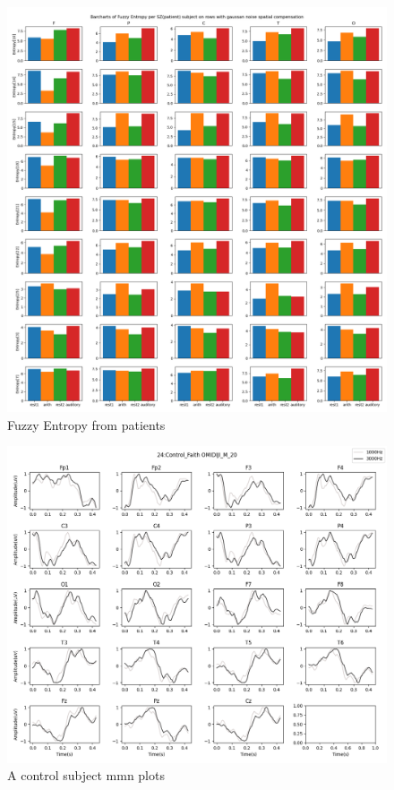 \documentclass[10pt]{article}
\begin{document}
\begin{figure}[H]
  \includegraphics[width=16cm]{../../../data_analysis_results/FuzzEnt/Patient/all-fuzzyEntr.png}
  \caption{Fuzzy Entropy from patients}
  \label{fig:patientFuzzEnt}
\end{figure}

\begin{figure}[H]
  \includegraphics[width=16cm]{../../../data_analysis_results/MMN/time_series/Control/24.png}
  \caption{A control subject \gls{mmn} plots}
  \label{fig:controlMMN}
\end{figure}
\end{document}
